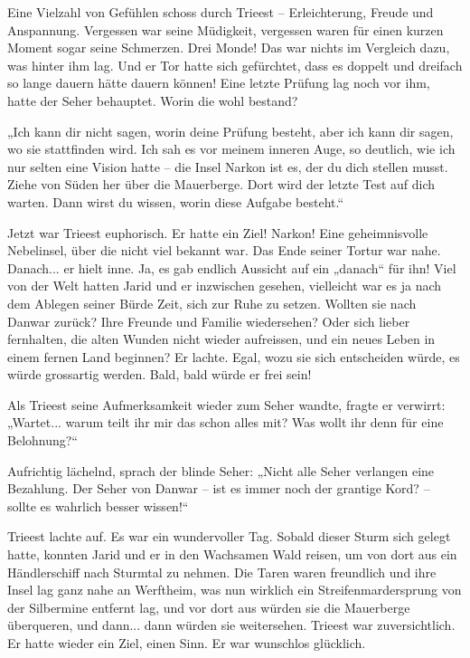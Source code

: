 \documentclass[10pt, a4paper, oneside]{book}
\begin{document}
Eine Vielzahl von Gefühlen schoss durch Trieest – Erleichterung, Freude und Anspannung. Vergessen war seine Müdigkeit, vergessen waren für einen kurzen Moment sogar seine Schmerzen. Drei Monde! Das war nichts im Vergleich dazu, was hinter ihm lag. Und er Tor hatte sich gefürchtet, dass es doppelt und dreifach so lange dauern hätte dauern können! Eine letzte Prüfung lag noch vor ihm, hatte der Seher behauptet. Worin die wohl bestand?

„Ich kann dir nicht sagen, worin deine Prüfung besteht, aber ich kann dir sagen, wo sie stattfinden wird. Ich sah es vor meinem inneren Auge, so deutlich, wie ich nur selten eine Vision hatte – die Insel Narkon ist es, der du dich stellen musst. Ziehe von Süden her über die Mauerberge. Dort wird der letzte Test auf dich warten. Dann wirst du wissen, worin diese Aufgabe besteht.“

Jetzt war Trieest euphorisch. Er hatte ein Ziel! Narkon! Eine geheimnisvolle Nebelinsel, über die nicht viel bekannt war. Das Ende seiner Tortur war nahe. Danach... er hielt inne. Ja, es gab endlich Aussicht auf ein „danach“ für ihn! Viel von der Welt hatten Jarid und er inzwischen gesehen, vielleicht war es ja nach dem Ablegen seiner Bürde Zeit, sich zur Ruhe zu setzen. Wollten sie nach Danwar zurück? Ihre Freunde und Familie wiedersehen? Oder sich lieber fernhalten, die alten Wunden nicht wieder aufreissen, und ein neues Leben in einem fernen Land beginnen? Er lachte. Egal, wozu sie sich entscheiden würde, es würde grossartig werden. Bald, bald würde er frei sein!

Als Trieest seine Aufmerksamkeit wieder zum Seher wandte, fragte er verwirrt: „Wartet... warum teilt ihr mir das schon alles mit? Was wollt ihr denn für eine Belohnung?“

Aufrichtig lächelnd, sprach der blinde Seher: „Nicht alle Seher verlangen eine Bezahlung. Der Seher von Danwar – ist es immer noch der grantige Kord? – sollte es wahrlich besser wissen!“\bigskip



Trieest lachte auf. Es war ein wundervoller Tag. Sobald dieser Sturm sich gelegt hatte, konnten Jarid und er in den Wachsamen Wald reisen, um von dort aus ein Händlerschiff nach Sturmtal zu nehmen. Die Taren waren freundlich und ihre Insel lag ganz nahe an Werftheim, was nun wirklich ein Streifenmardersprung von der Silbermine entfernt lag, und vor dort aus würden sie die Mauerberge überqueren, und dann... dann würden sie weitersehen. Trieest war zuversichtlich. Er hatte wieder ein Ziel, einen Sinn. Er war wunschlos glücklich.
\end{document}
